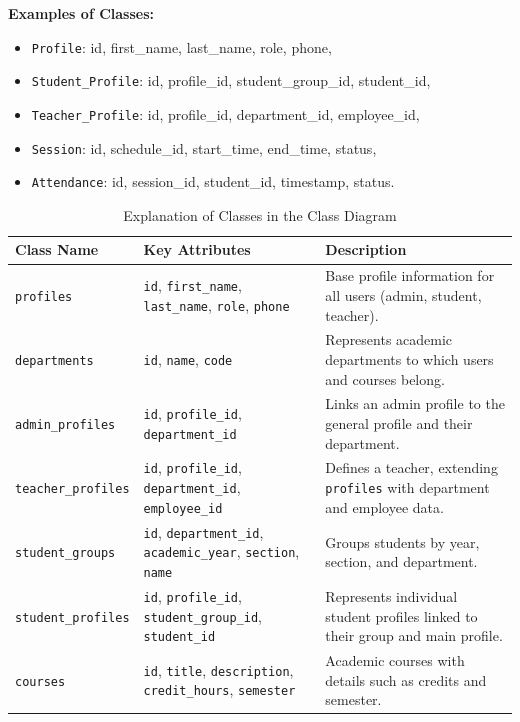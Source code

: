 \documentclass[12pt,a4paper]{report}
\begin{document}
\textbf{Examples of Classes:}
\begin{itemize}
  \item \texttt{Profile}: id, first\_name, last\_name, role, phone,
  \item \texttt{Student\_Profile}: id, profile\_id, student\_group\_id, student\_id,
  \item \texttt{Teacher\_Profile}: id, profile\_id, department\_id, employee\_id,
  \item \texttt{Session}: id, schedule\_id, start\_time, end\_time, status,
  \item \texttt{Attendance}: id, session\_id, student\_id, timestamp, status.
\end{itemize}


\begin{table}[H]
\centering
\small %
\caption{Explanation of Classes in the Class Diagram}
\renewcommand{\arraystretch}{1.3}
\begin{tabular}{|p{3cm}|p{4cm}|p{7.5cm}|}
\hline
\textbf{Class Name} & \textbf{Key Attributes} & \textbf{Description} \\
\hline
\texttt{profiles} & \texttt{id}, \texttt{first\_name}, \texttt{last\_name}, \texttt{role}, \texttt{phone} & Base profile information for all users (admin, student, teacher). \\
\hline
\texttt{departments} & \texttt{id}, \texttt{name}, \texttt{code} & Represents academic departments to which users and courses belong. \\
\hline
\texttt{admin\_profiles} & \texttt{id}, \texttt{profile\_id}, \texttt{department\_id} & Links an admin profile to the general profile and their department. \\
\hline
\texttt{teacher\_profiles} & \texttt{id}, \texttt{profile\_id}, \texttt{department\_id}, \texttt{employee\_id} & Defines a teacher, extending \texttt{profiles} with department and employee data. \\
\hline
\texttt{student\_groups} & \texttt{id}, \texttt{department\_id}, \texttt{academic\_year}, \texttt{section}, \texttt{name} & Groups students by year, section, and department. \\
\hline
\texttt{student\_profiles} & \texttt{id}, \texttt{profile\_id}, \texttt{student\_group\_id}, \texttt{student\_id} & Represents individual student profiles linked to their group and main profile. \\
\hline
\texttt{courses} & \texttt{id}, \texttt{title}, \texttt{description}, \texttt{credit\_hours}, \texttt{semester} & Academic courses with details such as credits and semester. \\

\end{tabular}
\end{table}
\end{document}
